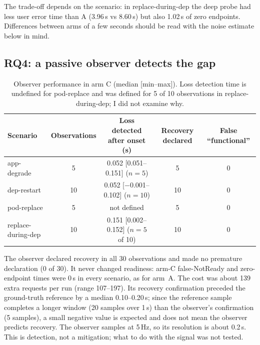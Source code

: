 \documentclass[11pt,a4paper]{article}
\begin{document}
The trade-off depends on the scenario: in replace-during-dep the deep probe had less user error time than A (3.96\,s vs 8.60\,s) but also 1.02\,s of zero endpoints. Differences between arms of a few seconds should be read with the noise estimate below in mind.

\subsection{RQ4: a passive observer detects the gap}
\begin{table}[H]
\centering\small
\begin{tabular}{@{}lcccc@{}}
\toprule
Scenario & Observations & Loss detected after onset (s) & Recovery declared & False ``functional''\\
\midrule
app-degrade & 5 & 0.052 [0.051--0.151] ($n{=}5$) & 5 & 0\\
dep-restart & 10 & 0.052 [$-$0.001--0.102] ($n{=}10$) & 10 & 0\\
pod-replace & 5 & not defined & 5 & 0\\
replace-during-dep & 10 & 0.151 [0.002--0.152] ($n{=}5$ of 10) & 10 & 0\\
\bottomrule
\end{tabular}
\caption{Observer performance in arm C (median [min--max]). Loss detection time is undefined for pod-replace and was defined for 5 of 10 observations in replace-during-dep; I did not examine why.}
\label{tab:observer}
\end{table}
The observer declared recovery in all 30 observations and made no premature declaration (0 of 30). It never changed readiness: arm-C false-NotReady and zero-endpoint times were 0\,s in every scenario, as for arm~A. The cost was about 139 extra requests per run (range 107--197). Its recovery confirmation preceded the ground-truth reference by a median 0.10--0.20\,s; since the reference sample completes a longer window (20 samples over 1\,s) than the observer's confirmation (5 samples), a small negative value is expected and does not mean the observer predicts recovery. The observer samples at 5\,Hz, so its resolution is about 0.2\,s. This is detection, not a mitigation; what to do with the signal was not tested.
\end{document}
